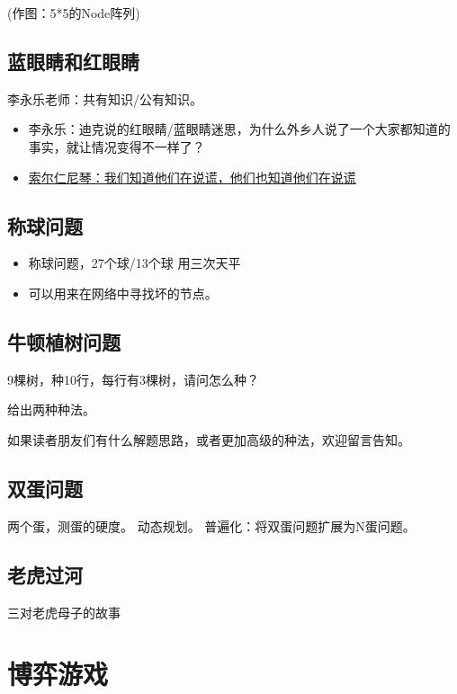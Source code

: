 \documentclass[export, 12pt, letterpaper]{ctexrep}
\begin{document}
(作图：5*5的Node阵列)


\section{蓝眼睛和红眼睛}
李永乐老师：共有知识/公有知识。


\begin{itemize}
\item{ 李永乐：迪克说的红眼睛/蓝眼睛迷思，为什么外乡人说了一个大家都知道的事实，就让情况变得不一样了？ }
\item{ \href{http://cnwmw.blogspot.com/2019/04/blog-post_92.html}{索尔仁尼琴：我们知道他们在说谎，他们也知道他们在说谎} }
\end{itemize}



\section{称球问题}

\begin{itemize}
\item{ 称球问题，27个球/13个球 用三次天平 }
\item{ 可以用来在网络中寻找坏的节点。 }
\end{itemize}



\section{牛顿植树问题}
9棵树，种10行，每行有3棵树，请问怎么种？

给出两种种法。

如果读者朋友们有什么解题思路，或者更加高级的种法，欢迎留言告知。


\section{双蛋问题}
两个蛋，测蛋的硬度。
动态规划。
普遍化：将双蛋问题扩展为N蛋问题。


\section{老虎过河}
三对老虎母子的故事




\chapter{博弈游戏}
\end{document}
